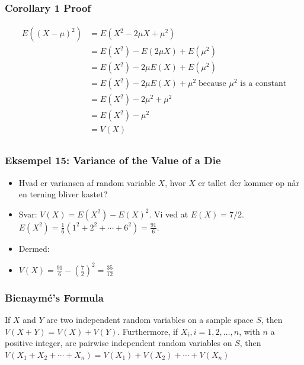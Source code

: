 \documentclass{beamer}
\begin{document}
\begin{frame}
  \frametitle{Corollary 1 Proof}
  \begin{equation*}
    \begin{split}
      E((X-\mu)^{2}) &= E(X^{2}-2 \mu X + \mu ^{2})\\
                   &= E(X^{2})-E(2 \mu X) + E(\mu ^{2})\\
                   &= E(X^{2}) - 2 \mu E(X) + E(\mu ^{2})\\
                   &= E(X^{2}) - 2 \mu E(X) + \mu ^{2}\; \text{because } \mu ^{2} \text{ is a constant}\\
                   &= E(X^{2}) - 2 \mu^{2} + \mu^{2}\\
                   &= E(X^{2}) - \mu^{2}\\
                   &= V(X)\\
    \end{split}
  \end{equation*}
\end{frame}


\begin{frame}
  \frametitle{Eksempel 15: Variance of the Value of a Die}
  \begin{itemize}
  \item Hvad er variansen af random variable $X$, hvor $X$ er tallet der kommer op når en terning bliver kastet?
  \item Svar: $V(X) = E(X^{2})-E(X)^{2}$. Vi ved at $E(X) = 7/2$. $E(X^{2}) = \frac{1}{6}(1^{2}+2^{2} + \cdots + 6^{2})= \frac{91}{6}$. 
  \item Dermed: 
  \item $V(X) = \frac{91}{6} - \left( \frac{7}{2}\right)^{2} = \frac{35}{12}$
  \end{itemize}
\end{frame}


\begin{frame}
  \frametitle{Bienaymé's Formula}
  \begin{theorem}
    If $X$ and $Y$ are two independent random variables on a sample space $S$, then $V(X+Y) = V(X) + V(Y)$. Furthermore, if $X_{i}, i = 1, 2, \ldots, n$, with $n$ a positive integer, are pairwise independent random variables on $S$, then $V(X_{1}+X_{2}+ \cdots +X_{n}) = V(X_{1}) + V(X_{2}) + \cdots + V(X_{n})$
  \end{theorem} 
\end{frame}
\end{document}
